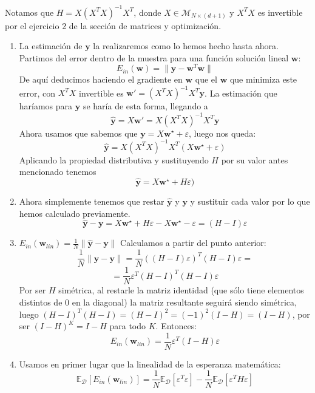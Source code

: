 \documentclass[11pt,leqno]{article}
\providecommand{\norm}[1]{\lVert#1\rVert}
\theoremstyle{definition}
\begin{document}
\begin{solucion}

Notamos que $H = X(X^TX)^{-1} X^T$, donde $X \in \mathcal{M}_{N \times (d+1)}$ y $X^TX$ es invertible por el ejercicio 2 de la sección de matrices y optimización.

\begin{enumerate}[a]
\item La estimación de $\mathbf{y}$ la realizaremos como lo hemos hecho hasta ahora. Partimos del error dentro de la muestra para una función solución lineal $\mathbf{w}$:
	\[ E_{in}(\mathbf{w}) = \norm{\mathbf{y}-\mathbf{w}^T\mathbf{w}} \]
	De aquí deducimos haciendo el gradiente en $\mathbf{w}$ que el $\mathbf{w}$ que minimiza este error, con $X^TX$ invertible es $\mathbf{w}\prime = (X^T X)^{-1}X^T \mathbf{y}$. La estimación que haríamos para $\mathbf{y}$ se haría de esta forma, llegando a
	\[ \mathbf{\hat{y}} = X\mathbf{w}\prime = X(X^T X)^{-1}X^T \mathbf{y}\]
	Ahora usamos que sabemos que $\mathbf{y} = X\mathbf{w}^\star + \varepsilon$, luego nos queda:
	\[ \mathbf{\hat{y}} =  X(X^T X)^{-1}X^T (X\mathbf{w}^\star + \varepsilon) \]
	Aplicando la propiedad distributiva y sustituyendo $H$ por su valor antes mencionado tenemos
	\[ \mathbf{\hat{y}}= X \mathbf{w}^\star + H \varepsilon) \]
	\item Ahora simplemente tenemos que restar $\mathbf{\hat{y}}$ y $\mathbf{y}$ y sustituir cada valor por lo que hemos calculado previamente.
	\[ \mathbf{\hat{y}} - \mathbf{y} = 
	X\mathbf{w}^\star + H\varepsilon -
	X\mathbf{w}^\star - \varepsilon = 
	(H - I) \varepsilon	\]
	\item $E_{in}( \mathbf{w}_{lin} ) = 
	\frac{1}{N} \norm{\mathbf{\hat{y}} - \mathbf{y}}$
	Calculamos a partir del punto anterior:
	\[ \frac{1}{N} \norm{\mathbf{\hat{y}} - \mathbf{y}} = 
	\frac{1}{N} ((H - I) \varepsilon)^T (H - I)\varepsilon=\]
	\[ = \frac{1}{N} \varepsilon^T (H-I)^T(H-I) \varepsilon\]
	Por ser $H$ simétrica, al restarle la matriz identidad (que sólo tiene elementos distintos de 0 en la diagonal) la matriz resultante seguirá siendo simétrica, luego $(H-I)^T(H-I)=(H-I)^2=(-1)^2(I-H)=(I-H)$, por ser $(I - H)^K = I - H$ para todo $K$. Entonces:
	\[ E_{in}( \mathbf{w}_{lin} ) =
	\frac{1}{N} \varepsilon^T (I-H) \varepsilon \]
	\item Usamos en primer lugar que la linealidad de la esperanza matemática:
	\[ \mathbb{E}_\mathcal{D} [E_{in}(\mathbf{w}_{lin})] =
	\frac{1}{N}\mathbb{E}_\mathcal{D} [\varepsilon^T\varepsilon] - 
	\frac{1}{N}\mathbb{E}_\mathcal{D} [\varepsilon^T H \varepsilon]\]

\end{enumerate}
\end{solucion}
\end{document}
